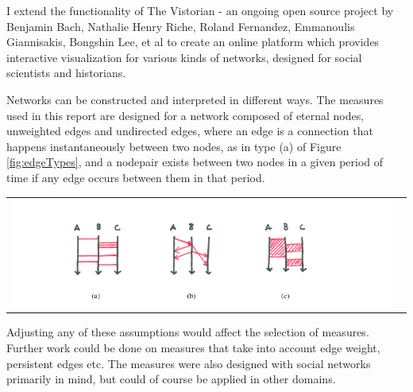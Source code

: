 I extend the functionality of The Vistorian \cite{bach:hal-01205822} - an ongoing open source project by Benjamin Bach, Nathalie Henry Riche, Roland Fernandez, Emmanoulis Giannisakis, Bongshin Lee, et al to create an online platform which provides interactive visualization for various kinds of networks, designed for social scientists and historians. 

Networks can be constructed and interpreted in different ways. The measures used in this report are designed for a network composed of eternal nodes, unweighted edges and undirected edges, where an edge is a connection that happens instantaneously between two nodes, as in type (a) of Figure \ref{fig:edgeTypes}, and a nodepair exists between two nodes in a given period of time if any edge occurs between them in that period. 

\begin{center}
\begin{tabular}{cc}
\includegraphics[trim={0 0 0 0}, width=140mm]{./Figures/edgeTypes.png}
\end{tabular}
\label{fig:edgeTypes}
\end{center}


Adjusting any of these assumptions would affect the selection of measures. Further work could be done on measures that take into account edge weight, persistent edges etc. The measures were also designed with social networks primarily in mind, but could of course be applied in other domains.




